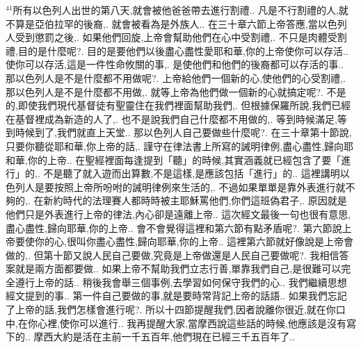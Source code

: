 \documentclass{book}
\begin{document}
$^{41}$所有以色列人出世的第八天,就會被他爸爸帶去進行割禮..
凡是不行割禮的人,就不算是亞伯拉罕的後裔,.
就會被看為是外族人..
在三十章六節上帝答應,當以色列人受到懲罰之後,.
如果他們回旋,上帝會幫助他們在心中受割禮,.
不只是肉體受割禮,目的是什麼呢?.
目的是要他們以後盡心盡性愛耶和華,你的上帝使你可以存活..
使你可以存活,這是一件性命攸關的事,.
是使他們和他們的後裔都可以存活的事..
那以色列人是不是什麼都不用做呢?.
上帝給他們一個新的心,使他們的心受割禮,.
那以色列人是不是什麼都不用做,.
就等上帝為他們做一個新的心就搞定呢?.
不是的,即使我們現代基督徒有聖靈住在我們裡面幫助我們,.
但根據保羅所說,我們已經在基督裡成為新造的人了,.
也不是說我們自己什麼都不用做的,.
等到時候滿足,等到時候到了,我們就直上天堂..
那以色列人自己要做些什麼呢?.
在三十章第十節說,只要你聽從耶和華,你上帝的話,.
謹守在律法書上所寫的誡明律例,盡心盡性,歸向耶和華,你的上帝..
在聖經裡面每逢提到「聽」的時候,其實涵義就已經包含了要「進行」的,.
不是聽了就入遊而出算數,不是這樣,是應該包括「進行」的..
這裡講明以色列人是要按照上帝所吩咐的誡明律例來生活的,.
不過如果單單是靠外表進行就不夠的,.
在新約時代的法理賽人都時時被主耶穌罵他們,你們這班偽君子,.
原因就是他們只是外表進行上帝的律法,內心卻是遠離上帝..
這次經文最後一句也很有意思,盡心盡性,歸向耶華,你的上帝..
會不會覺得這裡和第六節有點矛盾呢?.
第六節說上帝要使你的心,很叫你盡心盡性,歸向耶華,你的上帝..
這裡第六節就好像說是上帝會做的,.
但第十節又說人民自己要做,究竟是上帝做還是人民自己要做呢?.
我相信答案就是兩方面都要做..
如果上帝不幫助我們立志行善,單靠我們自己,是很難可以完全遵行上帝的話..
稍後我會舉三個事例,去學習如何保守我們的心..
我們繼續思想經文提到的事..
第一件自己要做的事,就是要時常背記上帝的話語..
如果我們忘記了上帝的話,我們怎樣會進行呢?.
所以十四節提醒我們,因者說離你很近,就在你口中,在你心裡,使你可以進行..
我再提醒大家,當摩西說這些話的時候,他應該是沒有寫下的..
摩西大約是活在主前一千五百年,他們現在已經三千五百年了..
\end{document}
